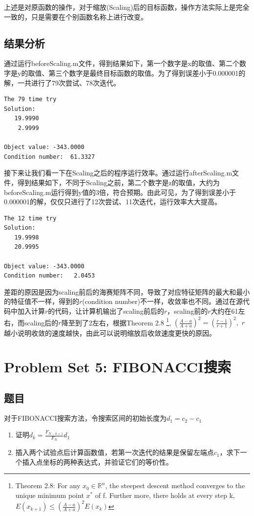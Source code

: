 \documentclass[a4paper, 12pt]{ctexart}  %
\begin{document}
上述是对原函数的操作，对于缩放(Scaling)后的目标函数，操作方法实际上是完全一致的，只是需要在个别函数名称上进行改变。
\subsection{结果分析}
通过运行beforeScaling.m文件，得到结果如下，第一个数字是x的取值、第二个数字是y的取值、第三个数字是最终目标函数的取值。为了得到误差小于0.000001的解，一共进行了79次尝试、78次迭代。
\begin{verbatim}
The 79 time try
Solution: 
   19.9990
    2.9999

Object value: -343.0000
Condition number:  61.3327
\end{verbatim}

接下来让我们看一下在Scaling之后的程序运行效率。通过运行afterScaling.m文件，得到结果如下，不同于Scaling之前，第二个数字是z的取值，大约为beforeScaling.m运行得到y值的3倍，符合预期。由此可见，为了得到误差小于0.000001的解，仅仅只进行了12次尝试、11次迭代，运行效率大大提高。
\begin{verbatim}
The 12 time try
Solution: 
   19.9998
   20.9995

Object value: -343.0000
Condition number:   2.0453
\end{verbatim}

差距的原因是因为scaling前后的海赛矩阵不同，导致了对应特征矩阵的最大和最小的特征值不一样，得到的$r$(condition number)不一样，收敛率也不同。通过在源代码中加入计算$r$的代码，让计算机输出了scaling前后的$r$，scaling前的$r$大约在61左右，而scaling后的$r$降至到了2左右，根据Theorem 2.8 \footnote{Theorem 2.8: For any $x_{0}\in \mathbb{R}^n$, the steepest descent method converges to the unique minimum point $x^*$ of f. Further more, there holds at every step k, $E(x_{k+1})\leq ( \frac{A-a}{A+a} ) ^2 E(x_{k})$ }, $( \frac{A-a}{A+a} ) ^2 = (\frac{r-1}{r+1})^2, $ $r$越小说明收敛的速度越快，由此可以说明缩放后收敛速度更快的原因。
\section{Problem Set 5: FIBONACCI搜索}
\subsection{题目}
对于FIBONACCI搜索方法，令搜索区间的初始长度为$d_{1}=c_{2}-c_{1}$
\begin{enumerate}
\item 证明$d_{k}=\frac{F_{N-k+1}}{F_{N}}d_{1}$
\item 插入两个试验点后计算函数值，若第一次迭代的结果是保留左端点$c_{1}$，求下一个插入点坐标的两种表达式，并验证它们的等价性。
\end{enumerate}
\end{document}
